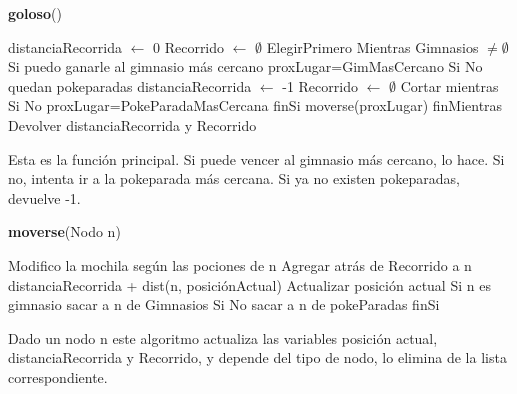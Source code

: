 \documentclass[spanish,12pt]{article}
\begin{document}
\begin{algorithm}[H]{\textbf{goloso}()}
	\begin{algorithmic}[1]
		\State distanciaRecorrida $\gets$ 0
		\State Recorrido $\gets$ $\emptyset$
		\State ElegirPrimero
		\State Mientras Gimnasios $\not= \emptyset$
		\State \quad Si puedo ganarle al gimnasio más cercano
		\State \qquad proxLugar=GimMasCercano
		\State \quad Si No quedan pokeparadas 
		\State \qquad distanciaRecorrida $\gets$ -1
		\State \qquad Recorrido $\gets$ $\emptyset$
		\State \qquad Cortar mientras
		\State \quad Si No
		\State \qquad proxLugar=PokeParadaMasCercana
		\State \quad finSi
		\State \quad moverse(proxLugar)
		\State finMientras
		\State Devolver distanciaRecorrida y Recorrido 
	\end{algorithmic}
\end{algorithm}

Esta es la función principal. Si puede vencer al gimnasio más cercano, lo hace. Si no, intenta ir a la pokeparada más cercana. Si ya no existen pokeparadas, devuelve -1.

\begin{algorithm}[H]{\textbf{moverse}(Nodo n)}
	\begin{algorithmic}[1]
		\State Modifico la mochila según las pociones de n
		\State Agregar atrás de Recorrido a n
		\State distanciaRecorrida + dist(n, posiciónActual)
		\State Actualizar posición actual
		\State Si n es gimnasio
		\State \quad sacar a n de Gimnasios
		\State Si No
		\State \quad sacar a n de pokeParadas
		\State finSi
	\end{algorithmic}
\end{algorithm}

Dado un nodo n este algoritmo actualiza las variables posición actual, distanciaRecorrida y Recorrido, y depende del tipo de nodo, lo elimina de la lista correspondiente.
\end{document}
